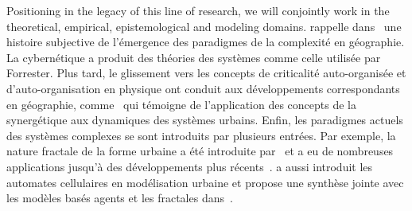 {Positioning in the legacy of this line of research, we will conjointly work in the theoretical, empirical, epistemological and modeling domains.
}{
 rappelle dans~\cite{pumain2003approche} une histoire subjective de l'émergence des paradigmes de la complexité en géographie. La cybernétique a produit des théories des systèmes comme celle utilisée par Forrester. Plus tard, le glissement vers les concepts de criticalité auto-organisée et d'auto-organisation en physique ont conduit aux développements correspondants en géographie, comme~\cite{sanders1992systeme} qui témoigne de l'application des concepts de la synergétique aux dynamiques des systèmes urbains. Enfin, les paradigmes actuels des systèmes complexes se sont introduits par plusieurs entrées. Par exemple, la nature fractale de la forme urbaine a été introduite par~\cite{batty1994fractal} et a eu de nombreuses applications jusqu'à des développements plus récents~\cite{keersmaecker2003using}. %
 a aussi introduit les automates cellulaires en modélisation urbaine et propose une synthèse jointe avec les modèles basés agents et les fractales dans~\cite{batty2007cities}. 
}
